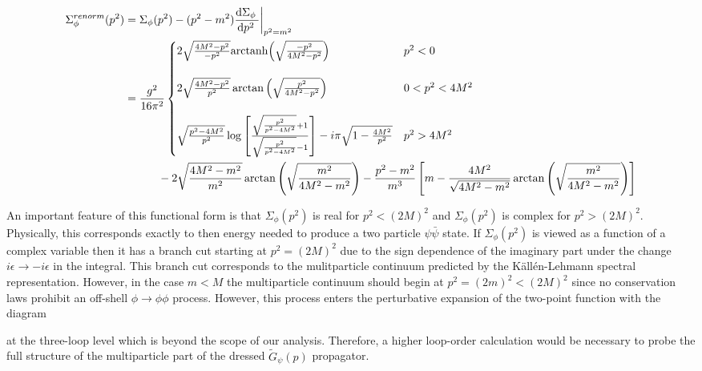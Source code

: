 \documentclass[12pt]{extarticle}
\begin{document}
\begin{align*}
\Sigma_\phi^{renorm}(p^2) & = \Sigma_\phi(p^2) - (p^2 - m^2) \frac{\mathrm{d}\Sigma_\phi \:}{\mathrm{d}p^2 \:} \bigg|_{p^2 = m^2} 
\\
& = 
\frac{g^2}{16 \pi^2}
\begin{cases}
2 \sqrt{\frac{4 M^2 - p^2}{-p^2}} \mathrm{arctanh}{\left(\sqrt{\frac{-p^2}{4 M^2 - p^2}}\right)} 
& p^2 < 0
\\
&
\\
2 \sqrt{\frac{4 M^2 - p^2}{p^2}} \arctan{\left( \sqrt{\frac{p^2}{4 M^2 - p^2}} \right)} 
& 0 < p^2 < 4 M^2 
\\
&
\\
\sqrt{\frac{p^2 - 4 M^2}{p^2}} \log{\left[ \frac{\sqrt{\frac{p^2}{p^2 - 4 M^2}} + 1}{\sqrt{\frac{p^2}{p^2 - 4 M^2}} - 1} \right]}  - i \pi \sqrt{1 - \frac{4 M^2}{p^2}}
& p^2 > 4 M^2
\end{cases}
\\ 
& \quad \quad \quad 
- 2 \sqrt{\frac{4 M^2 - m^2}{m^2}} \arctan{\left(\sqrt{\frac{m^2}{4 M^2 - m^2}}\right)}
- \frac{p^2 - m^2}{m^3} \left[ m - \frac{4 M^2}{\sqrt{4 M^2 - m^2}} \arctan{\left( \sqrt{\frac{m^2}{4 M^2 - m^2}} \right)} \right]
\end{align*}

An important feature of this functional form is that $\Sigma_\phi(p^2)$ is real for $p^2 < (2 M)^2$ and $\Sigma_\phi(p^2)$ is complex for $p^2 > (2 M)^2$. Physically, this corresponds exactly to then energy needed to produce a two particle $\psi \bar{\psi}$ state. If $\Sigma_\phi(p^2)$ is viewed as a function of a complex variable then it has a branch cut starting at $p^2 = (2 M)^2$ due to the sign dependence of the imaginary part under the change $i \epsilon \to - i \epsilon$ in the integral. This branch cut corresponds to the mulitparticle continuum predicted by the K{\"a}ll{\'e}n-Lehmann spectral representation. However, in the case $m < M$ the multiparticle continuum should begin at $p^2 = (2 m)^2 < (2 M)^2$ since no conservation laws prohibit an off-shell $\phi \to \phi \phi$ process. However, this process enters the perturbative expansion of the two-point function with the diagram
\begin{center}
\end{center}
at the three-loop level which is beyond the scope of our analysis. Therefore, a higher loop-order calculation would be necessary to probe the full structure of the multiparticle part of the dressed $\tilde{G}_{\psi}(p)$ propagator.  
\end{document}
